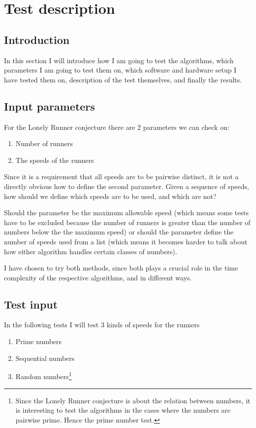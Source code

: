 \section{Test description}
\label{test}

\subsection{Introduction}
In this section I will introduce how I am going to test the algorithms, which parameters I am going to test them on, which software and hardware setup I have tested them on, description of the test themselves, and finally the results.

\subsection{Input parameters}
For the Lonely Runner conjecture there are 2 parameters we can check
on:
\begin{enumerate}
\item Number of runners
\item The speeds of the runners
\end{enumerate}

Since it is a requirement that all speeds are to be pairwise distinct,
it is not a directly obvious how to define the second
parameter. Given a sequence of speeds, how should we define which
speeds are to be used, and which are not? 

Should the parameter be the maximum allowable speed (which means some tests have to be
excluded because the number of runners is greater than the number of numbers below the the maximum speed) or should the parameter define the number of speeds used from a list (which means it becomes
harder to talk about how either algorithm handles certain classes of
numbers).

I have chosen to try both methods, since both plays a crucial role in
the time complexity of the respective algorithms, and in different ways.

\subsection{Test input}
In the following tests I will test 3 kinds of speeds for the runners
\begin{enumerate}
\item Prime numbers
\item Sequential numbers
\item Random numbers\footnote{Since the Lonely Runner conjecture is about the relation between numbers, it is interesting to test the algorithms in the cases where the numbers are pairwise prime. Hence the prime number test.}
\end{enumerate}

